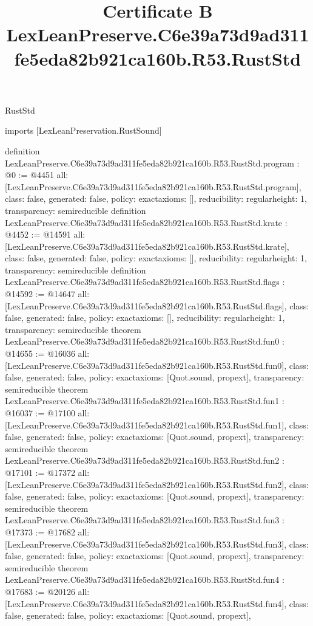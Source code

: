 \begin{lexlean}{RustStd}
\title{Certificate B LexLeanPreserve.C6e39a73d9ad311fe5eda82b921ca160b.R53.RustStd}
\begin{coremodule}
imports [LexLeanPreservation.RustSound]

definition LexLeanPreserve.C6e39a73d9ad311fe5eda82b921ca160b.R53.RustStd.program : @0 := @4451 {
  all: [LexLeanPreserve.C6e39a73d9ad311fe5eda82b921ca160b.R53.RustStd.program],
  class: false,
  generated: false,
  policy: exact{axioms: []},
  reducibility: regular{height: 1},
  transparency: semireducible
}
definition LexLeanPreserve.C6e39a73d9ad311fe5eda82b921ca160b.R53.RustStd.krate : @4452 := @14591 {
  all: [LexLeanPreserve.C6e39a73d9ad311fe5eda82b921ca160b.R53.RustStd.krate],
  class: false,
  generated: false,
  policy: exact{axioms: []},
  reducibility: regular{height: 1},
  transparency: semireducible
}
definition LexLeanPreserve.C6e39a73d9ad311fe5eda82b921ca160b.R53.RustStd.flags : @14592 := @14647 {
  all: [LexLeanPreserve.C6e39a73d9ad311fe5eda82b921ca160b.R53.RustStd.flags],
  class: false,
  generated: false,
  policy: exact{axioms: []},
  reducibility: regular{height: 1},
  transparency: semireducible
}
theorem LexLeanPreserve.C6e39a73d9ad311fe5eda82b921ca160b.R53.RustStd.fun0 : @14655 := @16036 {
  all: [LexLeanPreserve.C6e39a73d9ad311fe5eda82b921ca160b.R53.RustStd.fun0],
  class: false,
  generated: false,
  policy: exact{axioms: [Quot.sound, propext]},
  transparency: semireducible
}
theorem LexLeanPreserve.C6e39a73d9ad311fe5eda82b921ca160b.R53.RustStd.fun1 : @16037 := @17100 {
  all: [LexLeanPreserve.C6e39a73d9ad311fe5eda82b921ca160b.R53.RustStd.fun1],
  class: false,
  generated: false,
  policy: exact{axioms: [Quot.sound, propext]},
  transparency: semireducible
}
theorem LexLeanPreserve.C6e39a73d9ad311fe5eda82b921ca160b.R53.RustStd.fun2 : @17101 := @17372 {
  all: [LexLeanPreserve.C6e39a73d9ad311fe5eda82b921ca160b.R53.RustStd.fun2],
  class: false,
  generated: false,
  policy: exact{axioms: [Quot.sound, propext]},
  transparency: semireducible
}
theorem LexLeanPreserve.C6e39a73d9ad311fe5eda82b921ca160b.R53.RustStd.fun3 : @17373 := @17682 {
  all: [LexLeanPreserve.C6e39a73d9ad311fe5eda82b921ca160b.R53.RustStd.fun3],
  class: false,
  generated: false,
  policy: exact{axioms: [Quot.sound, propext]},
  transparency: semireducible
}
theorem LexLeanPreserve.C6e39a73d9ad311fe5eda82b921ca160b.R53.RustStd.fun4 : @17683 := @20126 {
  all: [LexLeanPreserve.C6e39a73d9ad311fe5eda82b921ca160b.R53.RustStd.fun4],
  class: false,
  generated: false,
  policy: exact{axioms: [Quot.sound, propext]},
}
\end{coremodule}
\end{lexlean}
